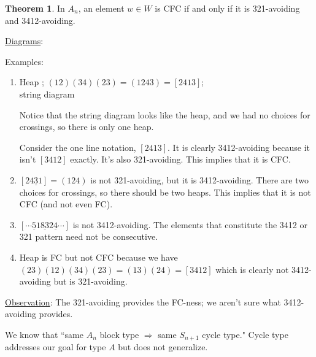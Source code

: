 \documentclass{article}
\theoremstyle{definition}
\theoremstyle{theorem}
\newtheorem*{theorem}{Theorem}
\begin{document}
\begin{theorem} In $A_n$, an element $w \in W$ is CFC if and only if it is 321-avoiding and 3412-avoiding.
\end{theorem}

    \underline{Diagrams}: \vspace{2in}

    Examples: \begin{enumerate}[label=(\alph*)]
\item Heap \hspace{1.5in} \vspace{0.2in}; $(12)(34)(23) = (1243) = [2413]$; \\ string diagram \vspace{1in}

	Notice that the string diagram looks like the heap, and we had no choices for crossings, so there is only one heap.
	
	Consider the one line notation, $[2413]$. It is clearly 3412-avoiding because it isn't $[3412]$ exactly. It's also 321-avoiding. This implies that it is CFC.
	
\item $[2\underline{431}] = (124)$ is not 321-avoiding, but it is 3412-avoiding.
	There are two choices for crossings, so there should be two heaps. This implies that it is not CFC (and not even FC). \vspace{1.2in}

\item $[\cdots \underline{5}1\underline{83}2\underline{4} \cdots]$ is not 3412-avoiding.
	The elements that constitute the 3412 or 321 pattern need not be consecutive.
	
\item Heap \hspace{1.5in} is FC but not CFC because we have $(23)(12)(34)(23) = (13)(24) = [3412]$ which is clearly not 3412-avoiding but is 321-avoiding.
\end{enumerate}

	\underline{Observation}: The 321-avoiding provides the FC-ness; we aren't sure what 3412-avoiding provides.
	
	We know that ``same $A_n$ block type $\Rightarrow$ same $S_{n+1}$ cycle type." Cycle type addresses our goal for type $A$ but does not generalize.
	
	
\end{document}
